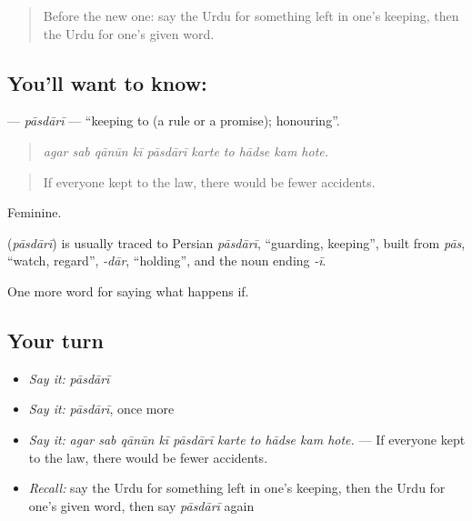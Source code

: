 \label{lesson:UR-C531-pasdari}



\begin{quote}
Before the new one: say the Urdu for something left in one's keeping, then the Urdu for one's given word.
\end{quote}

\subsection*{You'll want to know: }
\textbf{} — \emph{pāsdārī} — \textquotedblleft{}keeping to (a rule or a promise); honouring\textquotedblright{}.

\begin{quote}
         
\end{quote}

\begin{quote}
\emph{agar sab qānūn kī pāsdārī karte to hādse kam hote.}
\end{quote}

\begin{quote}
If everyone kept to the law, there would be fewer accidents.
\end{quote}

Feminine.

\begin{cousinweb}
\textbf{} (\emph{pāsdārī}) is usually traced to Persian \emph{pāsdārī}, \textquotedblleft{}guarding, keeping\textquotedblright{}, built from \emph{pās}, \textquotedblleft{}watch, regard\textquotedblright{}, \emph{-dār}, \textquotedblleft{}holding\textquotedblright{}, and the noun ending \emph{-ī}.
\end{cousinweb}

\begin{grammarlens}[title={What you've built}]
One more word for saying what happens if.
\end{grammarlens}

\subsection*{Your turn}
\begin{itemize}
\raggedright
  \item \emph{Say it:} \emph{pāsdārī}
  \item \emph{Say it:} \emph{pāsdārī}, once more
  \item \emph{Say it:} \emph{agar sab qānūn kī pāsdārī karte to hādse kam hote.} — If everyone kept to the law, there would be fewer accidents.
  \item \emph{Recall:} say the Urdu for something left in one's keeping, then the Urdu for one's given word, then say \emph{pāsdārī} again
\end{itemize}

